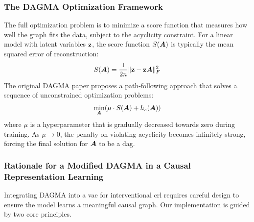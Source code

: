 \subsubsection{The DAGMA Optimization Framework}
\label{app:dagma:optimization}

The full optimization problem is to minimize a score function that measures how well the graph fits the data, subject to the acyclicity constraint.
For a linear model with latent variables ${\mathbf{z}}$, the score function $S({\bm{A}})$ is typically the mean squared error of reconstruction:
\begin{equation}
    S({\bm{A}}) = \frac{1}{2n} \lVert {\mathbf{z}} - {\mathbf{z}}{\bm{A}} \rVert_F^2
    \label{eq:app:dagma_score}
\end{equation}
The original DAGMA paper proposes a path-following approach that solves a sequence of unconstrained optimization problems:
\begin{equation}
    \min_{{\bm{A}}} (\mu \cdot S({\bm{A}}) + h_s({\bm{A}}))
\end{equation}
where $\mu$ is a hyperparameter that is gradually decreased towards zero during training.
As $\mu \to 0$, the penalty on violating acyclicity becomes infinitely strong, forcing the final solution for ${\bm{A}}$ to be a \gls{dag}.

\subsubsection{Rationale for a Modified DAGMA in a Causal Representation Learning}
\label{app:dagma:rationale}

Integrating DAGMA into a \gls{vae} for interventional \gls{crl} requires careful design to ensure the model learns a meaningful causal graph.
Our implementation is guided by two core principles.

